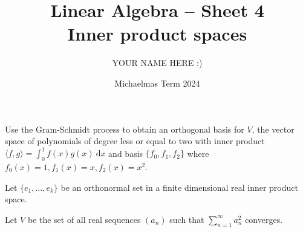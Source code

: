 \documentclass[answers]{exam}
\title{Linear Algebra -- Sheet 4\\Inner product spaces}
\author{YOUR NAME HERE :)}
\date{Michaelmas Term 2024}
\begin{document}
\maketitle

\begin{questions}

\question%
Use the Gram-Schmidt process to obtain an orthogonal basis for $V$, the vector space of polynomials of degree less or equal to two with inner product $\langle f, g\rangle=\int_{0}^{1} f(x) g(x) ~\mathrm{d} x$ and basis $\{f_{0}, f_{1}, f_{2}\}$ where $f_{0}(x)=1, f_{1}(x)=x, f_{2}(x)=x^{2}$.



\question%
Let $\{e_{1}, \ldots, e_{k}\}$ be an orthonormal set in a finite dimensional real inner product space.



\question%
Let $V$ be the set of all real sequences $(a_{n})$ such that $\sum_{n=1}^{\infty} a_{n}^{2}$ converges.
\end{questions}
\end{document}
